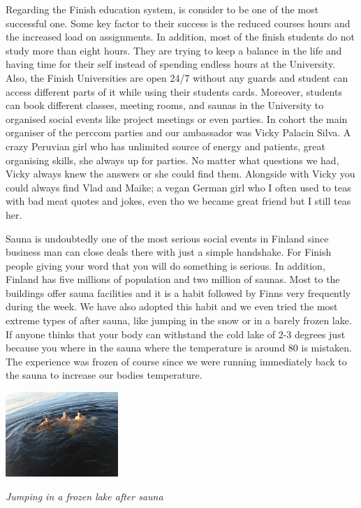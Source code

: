 \documentclass[10pt,a4paper]{article} %
\begin{document}
\begin{multicols}{3}
Regarding the Finish education system, is consider to be one of the most successful 
one. 
Some key factor to their success is the reduced courses hours and the increased 
load on assignments. 
In addition, most of the finish students do not study more than eight hours. 
They are trying to keep a balance in the life and having time for their self 
instead of spending endless hours at the University. 
Also, the Finish Universities are open 24/7 without any guards and student can 
access different parts of it while using their students cards. 
Moreover, students can book different classes, meeting rooms, and saunas 
in the University to organised social events like project meetings or even parties. 
In cohort the main organiser of the {\sc perccom} parties and our ambassador was 
Vicky Palacin Silva. 
A crazy Peruvian girl who has unlimited source of energy and patients, great 
organising skills, she always up for parties. 
No matter what questions we had, Vicky always knew the answers or she could 
find them. 
Alongside with Vicky you could always find Vlad and Maike; a vegan German girl 
who I often used to teas with bad meat quotes and jokes, even tho we became 
great friend but I still teas her.


Sauna is undoubtedly one of the most serious social events in Finland since business 
man can close deals there with just a simple handshake. 
For Finish people giving your word that you will do something is serious. 
In addition, Finland has five millions of population and two million of saunas. 
Most to the buildings offer sauna facilities and it is a habit followed by Finns 
very frequently during the week. 
We have also adopted this habit and we even tried the most extreme types of after 
sauna, like jumping in the snow or in a barely frozen lake. 
If anyone thinks that your body can withstand the cold lake of 2-3 degrees just 
because you where in the sauna where the temperature is around 80 is mistaken. 
The experience was frozen of course since we were running immediately back to the 
sauna to increase our bodies temperature.  


\begin{center}
	\includegraphics[width=0.32\textwidth]{media/after_sauna_lake.jpg}
	\par\textit{Jumping in a frozen lake after sauna}
\end{center}



\end{multicols}
\end{document}

